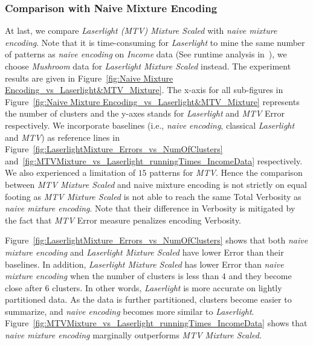 \subsubsection{Comparison with Naive Mixture Encoding}
\label{sec:Evaluating_Naive_Mixture_Encoding}

At last, we compare \emph{Laserlight (MTV) Mixture Scaled} with \emph{naive mixture encoding}.
Note that it is time-consuming for \emph{Laserlight} to mine the same number of patterns as \emph{naive encoding} on \emph{Income} data (See runtime analysis in~\cite{DBLP:journals/corr/abs-1809-00405}), we choose \emph{Mushroom} data for \emph{Laserlight Mixture Scaled} instead.
The experiment results are given in Figure~\ref{fig:Naive Mixture Encoding_vs_Laserlight&MTV_Mixture}. 
The x-axis for all sub-figures in Figure~\ref{fig:Naive Mixture Encoding_vs_Laserlight&MTV_Mixture} represents the number of clusters and the y-axes stands for \emph{Laserlight} and \emph{MTV} Error respectively.
We incorporate baselines (i.e., \emph{naive encoding}, classical \emph{Laserlight} and \emph{MTV}) as reference lines in Figure~\ref{fig:LaserlightMixture_Errors_vs_NumOfClusters} and~\ref{fig:MTVMixture_vs_Laserlight_runningTimes_IncomeData} respectively.
We also experienced a limitation of $15$ patterns for \emph{MTV}.
Hence the comparison between \emph{MTV Mixture Scaled} and {naive mixture encoding} is not strictly on equal footing as \emph{MTV Mixture Scaled} is not able to reach the same Total Verbosity as \emph{naive mixture encoding}.
Note that their difference in Verbosity is mitigated by the fact that \emph{MTV} Error measure penalizes encoding Verbosity.

Figure~\ref{fig:LaserlightMixture_Errors_vs_NumOfClusters} shows that both \emph{naive mixture encoding} and \emph{Laserlight Mixture Scaled} have lower Error than their baselines.
In addition, \emph{Laserlight Mixture Scaled} has lower Error than \emph{naive mixture encoding} when the number of clusters is less than $4$ and they become close after $6$ clusters.
In other words, \emph{Laserlight} is more accurate on lightly partitioned data. 
As the data is further partitioned, clusters become easier to summarize, and \emph{naive encoding} becomes more similar to \emph{Laserlight}.
Figure~\ref{fig:MTVMixture_vs_Laserlight_runningTimes_IncomeData} shows that \emph{naive mixture encoding} marginally outperforms \emph{MTV Mixture Scaled}.


